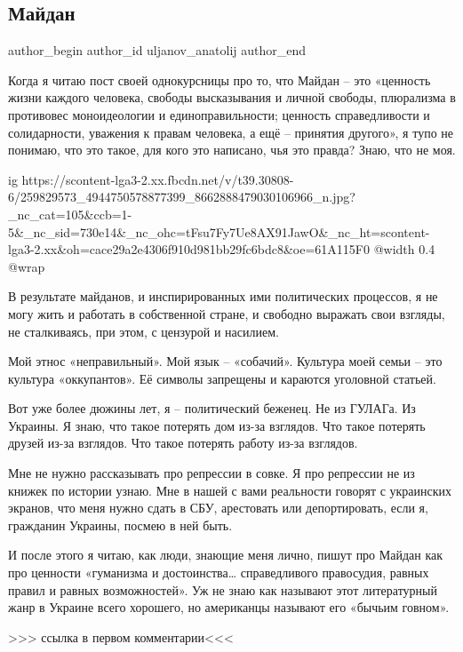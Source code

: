  
 
 
 
 
 
\subsection{Майдан}
\label{sec:22_11_2021.fb.uljanov_anatolij.1.maidan}
 
\ifcmt
 author_begin
   author_id uljanov_anatolij
 author_end
\fi

Когда я читаю пост своей однокурсницы про то, что Майдан – это «ценность жизни
каждого человека, свободы высказывания и личной свободы, плюрализма в
противовес моноидеологии и единоправильности; ценность справедливости и
солидарности, уважения к правам человека, а ещё – принятия другого», я тупо не
понимаю, что это такое, для кого это написано, чья это правда? Знаю, что не
моя.

\ifcmt
  ig https://scontent-lga3-2.xx.fbcdn.net/v/t39.30808-6/259829573_4944750578877399_8662888479030106966_n.jpg?_nc_cat=105&ccb=1-5&_nc_sid=730e14&_nc_ohc=tFsu7Fy7Ue8AX91JawO&_nc_ht=scontent-lga3-2.xx&oh=cace29a2e4306f910d981bb29fc6bdc8&oe=61A115F0
  @width 0.4
  @wrap 
\fi

В результате майданов, и инспирированных ими политических процессов, я не могу
жить и работать в собственной стране, и свободно выражать свои взгляды, не
сталкиваясь, при этом, с цензурой и насилием.

Мой этнос «неправильный». Мой язык – «собачий». Культура моей семьи – это
культура «оккупантов». Её символы запрещены и караются уголовной статьей.

Вот уже более дюжины лет, я – политический беженец. Не из ГУЛАГа. Из Украины. Я
знаю, что такое потерять дом из-за взглядов. Что такое потерять друзей из-за
взглядов. Что такое потерять работу из-за взглядов. 

Мне не нужно рассказывать про репрессии в совке. Я про репрессии не из книжек
по истории узнаю. Мне в нашей с вами реальности говорят с украинских экранов,
что меня нужно сдать в СБУ, арестовать или депортировать, если я, гражданин
Украины, посмею в ней быть. 

И после этого я читаю, как люди, знающие меня лично, пишут про Майдан как про
ценности «гуманизма и достоинства… справедливого правосудия, равных правил и
равных возможностей». Уж не знаю как называют этот литературный жанр в Украине
всего хорошего, но американцы называют его «бычьим говном».  

>>> ссылка в первом комментарии<<<
